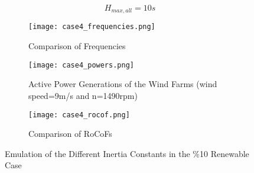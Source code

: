 \begin{equation}
\label{hmax22}
H_{max,all}=10s
\end{equation}
\begin{figure}[h!]
	\centering
	\begin{subfigure}{0.9\textwidth} %
		\centering	\texttt{[image: case4\_frequencies.png]}
		\caption{Comparison of Frequencies}		
		\label{Case4_freq}
	\end{subfigure}
\vspace{0.1em} %
\begin{subfigure}{0.9\textwidth}
	\centering	
	\texttt{[image: case4\_powers.png]}
	\caption{Active Power Generations of the Wind Farms (wind speed=9m/s and n=1490rpm)}
	\label{Case4_power}	
\end{subfigure}
	\vspace{0.1em} %
	\begin{subfigure}{0.9\textwidth}
		\centering	\texttt{[image: case4\_rocof.png]}
		\caption{Comparison of RoCoFs}
		\label{Case4_rocof}	
	\end{subfigure}
	\caption{Emulation of the Different Inertia Constants in the \%10 Renewable Case}
\end{figure}

